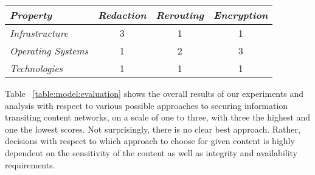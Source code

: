 \begin{table*}[tp] %
\centering %
\begin{tabular}{lccc}
\toprule %
{\it Property}			& {\it Redaction}	& {\it Rerouting} 	& {\it Encryption} 	\\\toprule
{\it Infrastructure} 	& 3				  	& 1					& 1				 	\\\midrule
{\it Operating Systems}	& 1					& 2					& 3 					\\\midrule
{\it Technologies}		& 1					& 1					& 1					\\\bottomrule
\end{tabular}
\caption{Approach Evaluation Summary}
\label{table:model:evaluation}
\end{table*}

Table ~\ref{table:model:evaluation} shows the overall results of our experiments and analysis with respect to various possible approaches to securing information transiting content networks, on a scale of one to three, with three the highest and one the lowest scores.  Not surprisingly, there is no clear best approach.  Rather, decisions with respect to which approach to choose for given content is highly dependent on the sensitivity of the content as well as integrity and availability requirements.